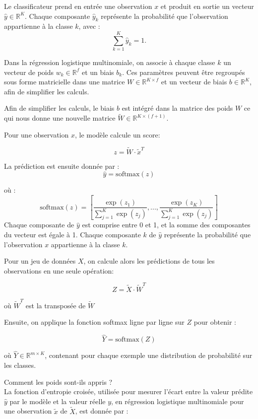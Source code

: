 \documentclass[12pt,a4paper]{report}
\begin{document}
Le classificateur prend en entrée une observation $x$ et produit en sortie un vecteur $\hat{y} \in \mathbb{R}^K$. Chaque composante $\hat{y}_k$ représente la probabilité que l’observation appartienne à la classe $k$, avec :
\[
\sum_{k=1}^{K} \hat{y}_k = 1.
\]

Dans la régression logistique multinomiale, on associe à chaque classe $k$ un vecteur de poids $w_k \in \mathbb{R}^f$ et un biais $b_k$. Ces paramètres peuvent être regroupés sous forme matricielle dans une matrice $W \in \mathbb{R}^{K \times f}$ et un vecteur de biais $b \in \mathbb{R}^K$, afin de simplifier les calculs.

Afin de simplifier les calculs, le biais $b$ est intégré dans la matrice des poids $W$ ce qui nous donne une nouvelle matrice $\tilde{W} \in \mathbb{R}^{K \times (f+1)}$.
	
Pour une observation $x$, le modèle calcule un score:

\[
z = \tilde W \cdot \tilde{x}^T
\]

La prédiction est ensuite donnée par :
\[
\hat{y} = \text{softmax}(z)
\]

où :
\[
	\text{softmax}(z) = [\frac{\exp(z_1)}{\sum_{j=1}^{K} \exp(z_j)}, ..., \frac{\exp(z_K)}{\sum_{j=1}^{K} \exp(z_j)}]
\]
Chaque composante de $\hat{y}$ est comprise entre 0 et 1, et la somme des composantes du vecteur est égale à 1.
Chaque composante $k$ de $\hat{y}$ représente la probabilité que l’observation $x$ appartienne à la classe $k$.
	

Pour un jeu de données $X$, on calcule alors les prédictions de tous les observations en une seule opération:

\[
Z = \tilde{X} \cdot \tilde{W}^T
\]

où $\tilde{W}^T$ est la transposée de $\tilde{W}$

Ensuite, on applique la fonction softmax ligne par ligne sur $Z$ pour obtenir :

\[
\hat{Y} = \text{softmax}(Z)
\]

où $\hat{Y} \in \mathbb{R}^{m \times K}$, contenant pour chaque exemple une distribution de probabilité sur les classes.

Comment les poids sont-ils appris ?\\

La fonction d’entropie croisée, utilisée pour mesurer l’écart entre la valeur prédite $\hat{y}$ par le modèle et la valeur réelle $y$, en régression logistique multinomiale pour une observation $\tilde{x}$ de $\tilde{X}$, est donnée par :
\end{document}
